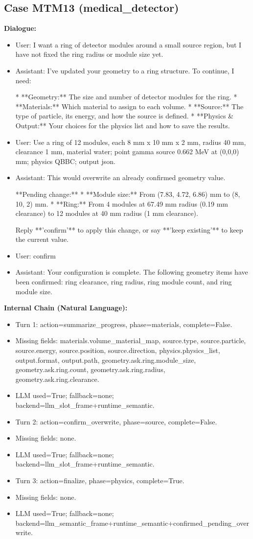 \documentclass[11pt]{ctexart}
\begin{document}
\subsection{Case MTM13 (medical\_detector)}
\textbf{Dialogue:}
\begin{itemize}
\item User: I want a ring of detector modules around a small source region, but I have not fixed the ring radius or module size yet.
\item Assistant: I've updated your geometry to a ring structure. To continue, I need:

*   **Geometry:** The size and number of detector modules for the ring.
*   **Materials:** Which material to assign to each volume.
*   **Source:** The type of particle, its energy, and how the source is defined.
*   **Physics \& Output:** Your choices for the physics list and how to save the results.
\item User: Use a ring of 12 modules, each 8 mm x 10 mm x 2 mm, radius 40 mm, clearance 1 mm, material water; point gamma source 0.662 MeV at (0,0,0) mm; physics QBBC; output json.
\item Assistant: This would overwrite an already confirmed geometry value.

**Pending change:**
*   **Module size:** From (7.83, 4.72, 6.86) mm to (8, 10, 2) mm.
*   **Ring:** From 4 modules at 67.49 mm radius (0.19 mm clearance) to 12 modules at 40 mm radius (1 mm clearance).

Reply **'confirm'** to apply this change, or say **'keep existing'** to keep the current value.
\item User: confirm
\item Assistant: Your configuration is complete. The following geometry items have been confirmed: ring clearance, ring radius, ring module count, and ring module size.
\end{itemize}
\textbf{Internal Chain (Natural Language):}
\begin{itemize}
\item Turn 1: action=summarize\_progress, phase=materials, complete=False.
\item Missing fields: materials.volume\_material\_map, source.type, source.particle, source.energy, source.position, source.direction, physics.physics\_list, output.format, output.path, geometry.ask.ring.module\_size, geometry.ask.ring.count, geometry.ask.ring.radius, geometry.ask.ring.clearance.
\item LLM used=True; fallback=none; backend=llm\_slot\_frame+runtime\_semantic.
\item Turn 2: action=confirm\_overwrite, phase=source, complete=False.
\item Missing fields: none.
\item LLM used=True; fallback=none; backend=llm\_slot\_frame+runtime\_semantic.
\item Turn 3: action=finalize, phase=physics, complete=True.
\item Missing fields: none.
\item LLM used=True; fallback=none; backend=llm\_semantic\_frame+runtime\_semantic+confirmed\_pending\_overwrite.
\end{itemize}
\end{document}
